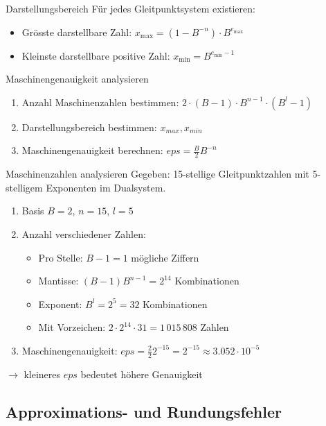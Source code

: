\begin{theorem}{Darstellungsbereich}
Für jedes Gleitpunktsystem existieren:
\begin{itemize}
    \item Grösste darstellbare Zahl: \large{$x_{\text{max}} = (1-B^{-n}) \cdot B^{e_{\text{max}}}$}
    \item \normalsize{Kleinste darstellbare positive Zahl:} \large{$x_{\text{min}} = B^{e_{\text{min}}-1}$}
\end{itemize}
\end{theorem}

\begin{KR}{Maschinengenauigkeit analysieren}
\begin{enumerate}
    \item Anzahl Maschinenzahlen bestimmen: $2 \cdot (B-1) \cdot B^{n-1} \cdot (B^l-1)$
    \item Darstellungsbereich bestimmen: $x_{max}, x_{min}$
    \item Maschinengenauigkeit berechnen: $eps = \frac{B}{2}B^{-n}$
\end{enumerate}
\end{KR}

\begin{example2}{Maschinenzahlen analysieren} \small
Gegeben: 15-stellige Gleitpunktzahlen mit 5-stelligem Exponenten im Dualsystem.
\begin{enumerate}
    \item Basis $B=2$, $n=15$, $l=5$
    \item Anzahl verschiedener Zahlen:
    \begin{itemize}
        \item Pro Stelle: $B-1=1$ mögliche Ziffern
        \item Mantisse: $(B-1)B^{n-1} = 2^{14}$ Kombinationen
        \item Exponent: $B^l = 2^5 = 32$ Kombinationen
        \item Mit Vorzeichen: $2 \cdot 2^{14} \cdot 31 = 1\,015\,808$ Zahlen
    \end{itemize}
    \item Maschinengenauigkeit:
    $eps = \frac{2}{2}2^{-15} = 2^{-15} \approx 3.052 \cdot 10^{-5}$
\end{enumerate}
$\rightarrow$ kleineres $eps$ bedeutet höhere Genauigkeit
\end{example2}



\subsection{Approximations- und Rundungsfehler}

